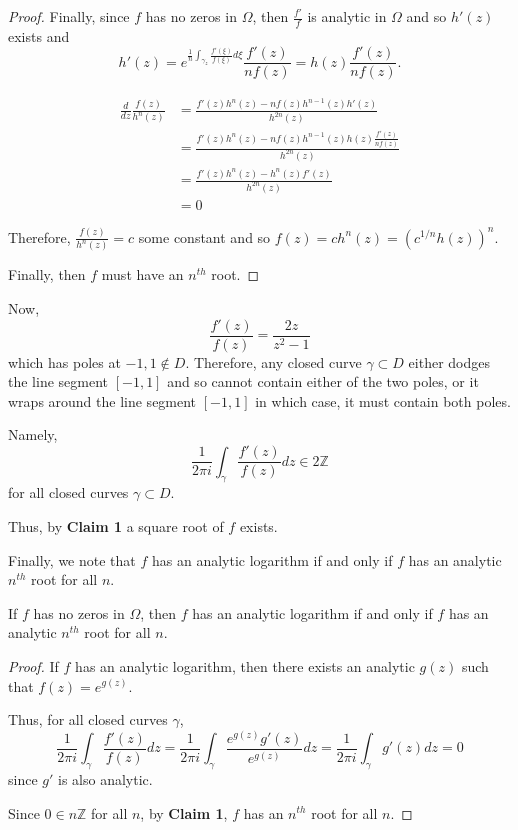 \documentclass[12pt]{Qual}
\begin{document}
\begin{solution}
\begin{claim}
\begin{proof}
Finally, since $f$ has no zeros in $\Omega$, then $\frac{f'}{f}$ is analytic in $\Omega$ and so $h'(z)$ exists and $$h'(z)=e^{\frac{1}{n}\int_{\gamma_z}\frac{f'(\xi)}{f(\xi)}d\xi}\frac{f'(z)}{nf(z)}=h(z)\frac{f'(z)}{nf(z)}.$$

\begin{align*}
    \frac{d}{dz}\frac{f(z)}{h^n(z)}&=\frac{f'(z)h^n(z)-nf(z)h^{n-1}(z)h'(z)}{h^{2n}(z)}\\
    &=\frac{f'(z)h^n(z)-nf(z)h^{n-1}(z)h(z)\frac{f'(z)}{nf(z)}}{h^{2n}(z)}\\
    &=\frac{f'(z)h^n(z)-h^n(z)f'(z)}{h^{2n}(z)}\\
    &=0
\end{align*}

Therefore, $\frac{f(z)}{h^n(z)}=c$ some constant and so $f(z)=ch^n(z)=(c^{1/n}h(z))^n$.

Finally, then $f$ must have an $n^{th}$ root.
\end{proof}
\end{claim}

Now, $$\frac{f'(z)}{f(z)}=\frac{2z}{z^2-1}$$ which has poles at $-1,1\notin D$. Therefore, any closed curve $\gamma\subset D$ either dodges the line segment $[-1,1]$ and so cannot contain either of the two poles, or it wraps around the line segment $[-1,1]$ in which case, it must contain both poles.

Namely, $$\frac{1}{2\pi i}\int_\gamma\frac{f'(z)}{f(z)}dz\in2\mathbb{Z}$$ for all closed curves $\gamma\subset D$.

Thus, by \textbf{Claim 1} a square root of $f$ exists.

Finally, we note that $f$ has an analytic logarithm if and only if $f$ has an analytic $n^{th}$ root for all $n$.

\begin{claim} If $f$ has no zeros in $\Omega$, then $f$ has an analytic logarithm if and only if $f$ has an analytic $n^{th}$ root for all $n$.
\begin{proof} \boxed{\implies} If $f$ has an analytic logarithm, then there exists an analytic $g(z)$ such that $f(z)=e^{g(z)}.$

Thus, for all closed curves $\gamma$, $$\frac{1}{2\pi i}\int_\gamma\frac{f'(z)}{f(z)}dz=\frac{1}{2\pi i}\int_\gamma\frac{e^{g(z)}g'(z)}{e^{g(z)}}dz=\frac{1}{2\pi i}\int_\gamma g'(z)dz=0$$ since $g'$ is also analytic.

Since $0\in n\mathbb{Z}$ for all $n$, by \textbf{Claim 1}, $f$ has an $n^{th}$ root for all $n$.


\end{proof}
\end{claim}
\end{solution}
\end{document}
